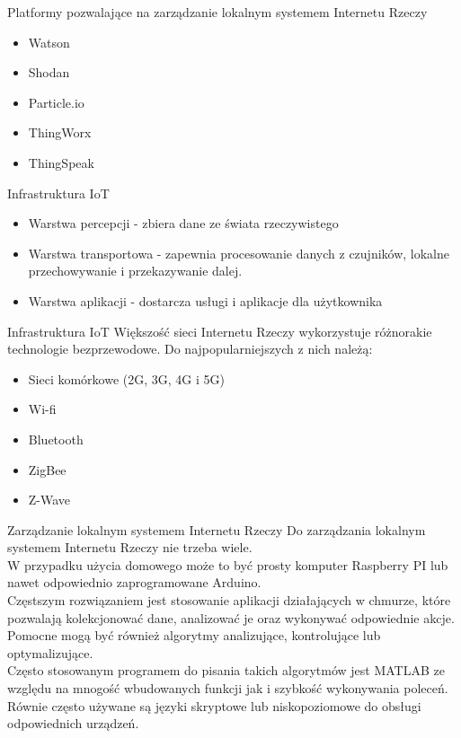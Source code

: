 \documentclass{beamer}
\begin{document}
\begin{frame}{Platformy pozwalające na zarządzanie lokalnym systemem Internetu Rzeczy}
    \begin{itemize}
        \item Watson
        \item Shodan
        \item Particle.io
        \item ThingWorx
        \item ThingSpeak
    \end{itemize}
\end{frame}

\begin{frame}{Infrastruktura IoT}
    \begin{itemize}
        \item Warstwa percepcji - zbiera dane ze świata rzeczywistego
        \item Warstwa transportowa - zapewnia procesowanie danych z czujników, lokalne przechowywanie i przekazywanie dalej.
        \item Warstwa aplikacji - dostarcza usługi i aplikacje dla użytkownika 
    \end{itemize}
\end{frame}

\begin{frame}{Infrastruktura IoT}
    Większość sieci Internetu Rzeczy wykorzystuje różnorakie technologie bezprzewodowe. Do najpopularniejszych z nich należą:
    \begin{itemize}
        \item Sieci komórkowe (2G, 3G, 4G i 5G)
        \item Wi-fi
        \item Bluetooth
        \item ZigBee
        \item Z-Wave
    \end{itemize}
\end{frame}

\begin{frame}{Zarządzanie lokalnym systemem Internetu Rzeczy}
       Do zarządzania lokalnym systemem Internetu Rzeczy nie trzeba wiele.\\
       W przypadku użycia domowego może to być prosty komputer Raspberry PI lub nawet odpowiednio zaprogramowane Arduino.\\
       Częstszym rozwiązaniem jest stosowanie aplikacji działających w chmurze, które pozwalają kolekcjonować dane, analizować je oraz wykonywać odpowiednie akcje.\\
       Pomocne mogą być również algorytmy analizujące, kontrolujące lub optymalizujące.\\
       Często stosowanym programem do pisania takich algorytmów jest MATLAB ze względu na mnogość wbudowanych funkcji jak i szybkość wykonywania poleceń.\\
       Równie często używane są języki skryptowe lub niskopoziomowe do obsługi odpowiednich urządzeń.
\end{frame}
\end{document}
